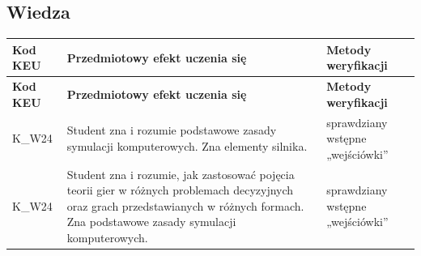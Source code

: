 \documentclass[12pt, a4paper]{article}
\newcommand{\thdrule}{\noalign{\global\setlength{\extrarowheight}{0pt}}}
\newcommand{\thdend}{\noalign{\global\setlength{\extrarowheight}{3pt}}}
\begin{document}
\subsection*{Wiedza}
{\scriptsize
\begin{longtable}{m{1.6cm}m{9.0cm}m{4.2cm}}
\thdrule\toprule
\rowcolor{pjatkRed} {\color{white}\footnotesize\textbf{\vphantom{Ag}Kod KEU}} & {\color{white}\footnotesize\textbf{\vphantom{Ag}Przedmiotowy efekt uczenia się}} & {\color{white}\footnotesize\textbf{\vphantom{Ag}Metody weryfikacji}} \\
\midrule\thdend
\endfirsthead
\thdrule\toprule
\rowcolor{pjatkRed} {\color{white}\footnotesize\textbf{\vphantom{Ag}Kod KEU}} & {\color{white}\footnotesize\textbf{\vphantom{Ag}Przedmiotowy efekt uczenia się}} & {\color{white}\footnotesize\textbf{\vphantom{Ag}Metody weryfikacji}} \\
\midrule\thdend
\endhead
  \rowcolor{tableRowLight} K\_W24 & Student zna i rozumie podstawowe zasady symulacji komputerowych. Zna elementy silnika. & sprawdziany wstępne „wejściówki'' \\
  \rowcolor{tableRowAlt} K\_W24 & Student zna i rozumie, jak zastosować pojęcia teorii gier w różnych problemach decyzyjnych oraz grach przedstawianych w różnych formach.  Zna podstawowe zasady symulacji komputerowych. & sprawdziany wstępne „wejściówki'' \\
\bottomrule
\end{longtable}}
\end{document}
